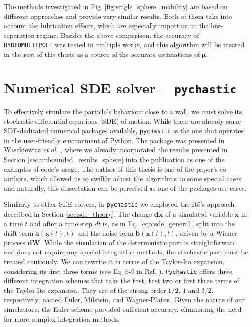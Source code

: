 \documentclass{master_thesis}
\def\code#1{\texttt{#1}}
\begin{document}
The methods investigated in Fig. \ref{fig:single_sphere_mobility} are based on different approaches and provide very similar results. Both of them take into account the lubrication effects, which are especially important in the low-separation regime. Besides the above comparison, the accuracy of \code{HYDROMULTIPOLE} was tested in multiple works, and this algorithm will be treated in the rest of this thesis as a source of the accurate estimations of $\bm{\mu}$.

\section{Numerical SDE solver -- \code{pychastic}} \label{sec:methodology_pychastic}

To effectively simulate the particle's behaviour close to a wall, we must solve its stochastic differential equations (SDE) of motion. While there are already some SDE-dedicated numerical packages available, \code{pychastic} is the one that operates in the user-friendly environment of Python. The package was presented in Waszkiewicz \textit{et al.} \cite{waszkiewicz2023}, where we already incorporated the results presented in Section \ref{sec:unbounded_results_sphere} into the publication as one of the examples of code's usage. The author of this thesis is one of the paper's co-authors, which allowed us to swiftly adjust the algorithms to some special cases and naturally, this dissertation can be perceived as one of the packages use cases.

Similarly to other SDE solvers, in \code{pychastic} we employed the Itō's approach, described in Section \ref{sec:sde_theory}. The change $\boldsymbol{dx}$ of a simulated variable $\boldsymbol{x}$ in a time $t$ and after a time step $dt$ is, as in Eq. \eqref{eqn:sde_general}, split into the drift term $\boldsymbol{a}(\boldsymbol{x}(t),t)$ and the noise term $\boldsymbol{b}(\boldsymbol{x}(t),t)$, driven by a Wiener process $\boldsymbol{dW}$. While the simulation of the deterministic part is straightforward and does not require any special integration methods, the stochastic part must be treated cautiously. We can rewrite it in terms of the Taylor-Itō expansion, considering its first three terms (see Eq. 6-9 in Ref. \cite{waszkiewicz2023}). \code{Pychastic} offers three different integration schemes that take the first, first two or first three terms of the Taylor-Itō expansion. They are of the strong order $1/2$, $1$ and $3/2$, respectively, named Euler, Milstein, and Wagner-Platen. Given the nature of our simulations, the Euler scheme provided sufficient accuracy, eliminating the need for more complex integration methods.
\end{document}

